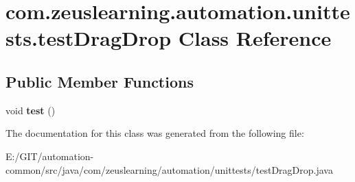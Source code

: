 \hypertarget{classcom_1_1zeuslearning_1_1automation_1_1unittests_1_1testDragDrop}{}\section{com.\+zeuslearning.\+automation.\+unittests.\+test\+Drag\+Drop Class Reference}
\label{classcom_1_1zeuslearning_1_1automation_1_1unittests_1_1testDragDrop}
\subsection*{Public Member Functions}
\begin{DoxyCompactItemize}
\item 
\hypertarget{classcom_1_1zeuslearning_1_1automation_1_1unittests_1_1testDragDrop_a2e2bf9e119a8206eba10e3e2198cafc8}{}\label{classcom_1_1zeuslearning_1_1automation_1_1unittests_1_1testDragDrop_a2e2bf9e119a8206eba10e3e2198cafc8} 
void {\bfseries test} ()
\end{DoxyCompactItemize}


The documentation for this class was generated from the following file\+:\begin{DoxyCompactItemize}
\item 
E\+:/\+G\+I\+T/automation-\/common/src/java/com/zeuslearning/automation/unittests/test\+Drag\+Drop.\+java\end{DoxyCompactItemize}
